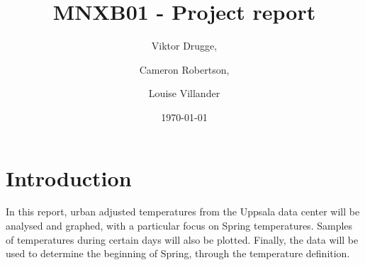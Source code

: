 \documentclass[a4paper,12pt]{article}
\title{\textbf{MNXB01} - Project report}
\date{\today}
\author{Viktor Drugge, \and Cameron Robertson, \and Louise Villander}
\begin{document}
	\maketitle
	\section{Introduction}
	\label{sec:pre}
	In this report, urban adjusted temperatures from the Uppsala data center will be analysed
	and graphed, with a particular focus on Spring temperatures. Samples of temperatures during certain
	days will also be plotted. Finally, the data will be used to determine the beginning of Spring, through
	the temperature definition.
	
	
	
\end{document}
